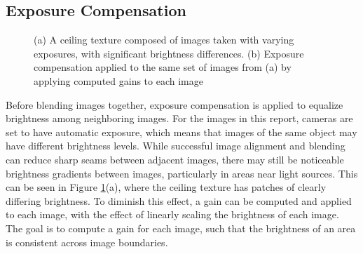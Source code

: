 \documentclass[]{spie}  %
\begin{document}
\subsection{Exposure Compensation}
\label{sec:exposureCompensation}

\begin{figure}
  \centering
  \caption{(a) A ceiling texture composed of images taken with varying
    exposures, with significant brightness differences. (b) Exposure
    compensation applied to the same set of images from (a) by
    applying computed gains to each image}
  \label{fig:exposureDiff}
\end{figure}


Before blending images together, exposure compensation is applied to
equalize brightness among neighboring images. For the images in this
report, cameras are set to have automatic exposure, which means that
images of the same object may have different brightness levels. While
successful image alignment and blending can reduce sharp seams between
adjacent images, there may still be noticeable brightness gradients
between images, particularly in areas near light sources. This can be
seen in Figure \ref{fig:exposureDiff}(a), where the ceiling texture
has patches of clearly differing brightness. To diminish this effect,
a gain can be computed and applied to each image, with the effect of
linearly scaling the brightness of each image. The goal is to compute
a gain for each image, such that the brightness of an area is
consistent across image boundaries.
\end{document}
